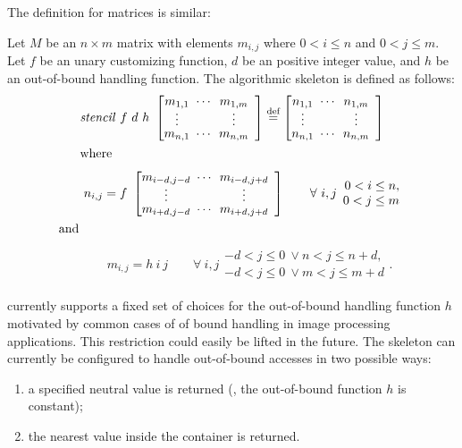 \noindent
The definition for matrices is similar:
\begin{definition}
  \label{definition:mapoverlap:matrix}
  Let $M$ be an $n\times m$ matrix with elements $m_{i,j}$ where $0 < i \leq n$ and $0 < j \leq m$.
  Let $f$ be an unary customizing function, $d$ be an positive integer value, and $h$ be an out-of-bound handling function.
  The algorithmic skeleton \stencil is defined as follows:
  \begin{equation*}
    \begin{split}
    & \stencil\ f\  d\ h\ \DottedMatrix{m_{1,1}}{m_{1,m}}{m_{n,1}}{m_{n,m}}
               \eqdef \DottedMatrix{n_{1,1}}{n_{1,m}}{n_{n,1}}{n_{n,m}}\\
               &\text{where}
    \end{split}
  \end{equation*}
  \begin{equation*}
    \begin{split}
    &\qquad n_{i,j} = f\ \DottedMatrix{m_{i-d,j-d}}{m_{i-d,j+d}}{m_{i+d,j-d}}{m_{i+d,j+d}} \qquad \forall\ i,j
        \begin{array}{r} 0 < i \leq n,\\ 0 < j \leq m \end{array}\\
        &\text{and}\\
    \end{split}
  \end{equation*}
  \begin{equation*}
    \begin{split}
    &\qquad m_{i,j} = h\ i\ j \qquad \forall\ i,j \begin{array}{l} -d < j \leq 0\ \vee n < j \leq n+d,\\ -d < j \leq 0\ \vee m < j \leq m+d \end{array} .
    \end{split}
  \end{equation*}
\end{definition}


\SkelCL currently supports a fixed set of choices for the out-of-bound handling function $h$ motivated by common cases of of bound handling in image processing applications.
This restriction could easily be lifted in the future.
The \stencil skeleton can currently be configured to handle out-of-bound accesses in two possible ways:
\begin{enumerate}
  \item a specified neutral value is returned (\ie, the out-of-bound function $h$ is constant);
  \item the nearest value inside the container is returned.
\end{enumerate}


